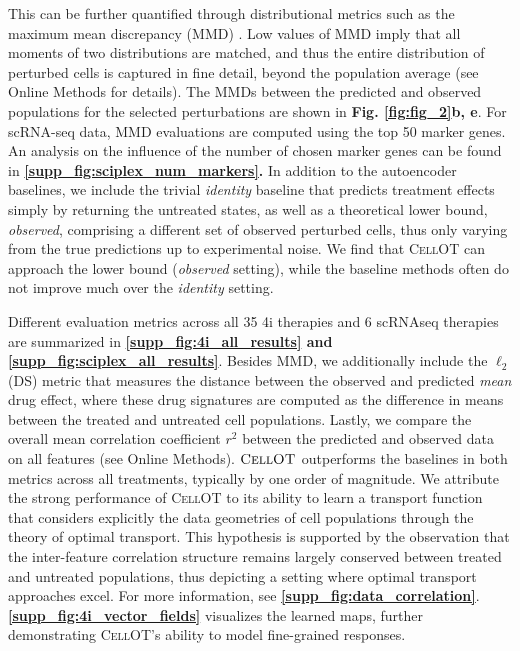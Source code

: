 This can be further quantified %
through distributional metrics such as the maximum mean discrepancy (MMD) \cite{gretton2012kernel}.
Low values of MMD imply that all moments of two distributions are matched, and thus the entire distribution of perturbed cells is captured in fine detail, beyond the population average (see Online Methods for details).
The MMDs between the predicted and observed populations for the selected perturbations are shown in \textbf{Fig. \ref{fig:fig_2}b, e}.
For scRNA-seq data, MMD evaluations are computed using the top 50 marker genes. An analysis on the influence of the number of chosen marker genes can be found in \textbf{\ref{supp_fig:sciplex_num_markers}.}
In addition to the autoencoder baselines, we include the trivial \emph{identity} baseline that predicts treatment effects simply by returning the untreated states,
as well as a theoretical lower bound, \emph{observed}, comprising a different set of observed perturbed cells, thus only varying from the true predictions up to experimental noise.
We find that \textsc{CellOT} can approach the lower bound (\emph{observed} setting), while the baseline methods often do not improve much over the \emph{identity} setting.

Different evaluation metrics across all 35 4i therapies and 6 scRNAseq therapies are summarized in \textbf{\ref{supp_fig:4i_all_results} and \textbf{\ref{supp_fig:sciplex_all_results}}}.
Besides MMD, we additionally include the $\ell_2$(DS) metric that measures the distance between the observed and predicted \emph{mean} drug effect, where these drug signatures are computed as the difference in means between the treated and untreated cell populations.
Lastly, we compare the overall mean correlation coefficient $r^2$ between the predicted and observed data on all features (see Online Methods).
$\textsc{CellOT}$ outperforms the baselines in both metrics across all treatments, typically by one order of magnitude.
We attribute the strong performance of \textsc{CellOT} to its ability to learn a transport function that considers explicitly the data geometries of cell populations through the theory of optimal transport.
This hypothesis is supported by the observation that the inter-feature correlation structure remains largely conserved between treated and untreated populations, thus depicting a setting where optimal transport approaches excel. For more information, see \textbf{\ref{supp_fig:data_correlation}}.
\textbf{\ref{supp_fig:4i_vector_fields}} visualizes the learned maps, %
further demonstrating \textsc{CellOT}'s ability to model fine-grained responses. %

